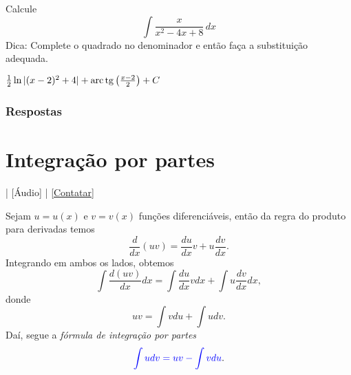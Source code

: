 \begin{exer}
  Calcule
  \begin{equation}
    \int\frac{x}{x^2-4x+8}\,dx
  \end{equation}
  Dica: Complete o quadrado no denominador e então faça a substituição adequada.
\end{exer}
\begin{resp}
  $\frac{1}{2}\ln|(x-2)^2+4|+\operatorname{arc}\operatorname{tg}\left(\frac{x-2}{2}\right) + C$
\end{resp}

\ifisbook
\subsubsection{Respostas}
\shipoutAnswer
\fi


\section{Integração por partes}\label{cap_int_sec_partes}

\begin{flushright}
  [Vídeo] | [Áudio] | \href{https://phkonzen.github.io/notas/contato.html}{[Contatar]}
\end{flushright}

Sejam $u=u(x)$ e $v=v(x)$ funções diferenciáveis, então da regra do produto para derivadas temos
\begin{equation}
  \frac{d}{dx}(uv) = \frac{du}{dx}v + u\frac{dv}{dx}.
\end{equation}
Integrando em ambos os lados, obtemos
\begin{equation}
  \int \frac{d (uv)}{dx}dx = \int \frac{du}{dx}vdx + \int u\frac{dv}{dx}dx,
\end{equation}
donde
\begin{equation}
  uv = \int vdu + \int udv.
\end{equation}
Daí, segue a \emph{fórmula de integração por partes}
\begin{equation}
  {\color{blue}\int udv = uv - \int vdu}.
\end{equation}


